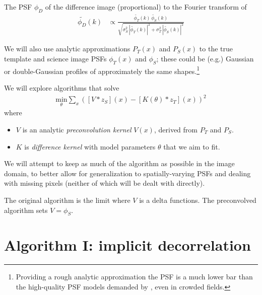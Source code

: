 \documentclass[DM,authoryear,toc]{lsstdoc}
\newcommand{\ZOGY}{\citetalias{2016ApJ...830...27Z}}
\newcommand{\AL}{\citetalias{1998ApJ...503..325A}}
\begin{document}
The PSF $\phi_D$ of the difference image (proportional) to the Fourier transform of
\begin{align}
  \widetilde{\phi_D}(k) &\propto \frac{
      \widetilde{\phi_T}(k) \, \widetilde{\phi_S}(k)
    }{
      \sqrt{
          \sigma_S^2 \, \left|\widetilde{\phi_T}(k)\right|^2
          + \sigma_T^2 \, \left|\widetilde{\phi_S}(k)\right|^2
      }
    }
  \label{eqn:zogy-psf}
\end{align}

We will also use analytic approximations $P_T(x)$ and $P_S(x)$ to the true template and science image PSFs $\phi_T(x)$ and $\phi_S$; these could be (e.g.) Gaussian or double-Gaussian profiles of approximately the same shapes.\footnote{Providing a rough analytic approximation the PSF is a much lower bar than the high-quality PSF models demanded by \ZOGY{}, even in crowded fields.}

We will explore algorithms that solve
\begin{align}
  \underset{\theta}{\text{min}} \sum_x \left(
        \left[V \ast z_S\right]\!(x) - \left[K(\theta) \ast z_T\right]\!(x)
      \right)^2
\end{align}
where
\begin{itemize}
  \item $V$ is an analytic \emph{preconvolution kernel} $V(x)$, derived from $P_T$ and $P_S$.
  \item $K$ is \emph{difference kernel} with model parameters $\theta$ that we aim to fit.
\end{itemize}

We will attempt to keep as much of the algorithm as possible in the image domain, to better allow for generalization to spatially-varying PSFs and dealing with missing pixels (neither of which will be dealt with directly).

The original \AL{} algorithm is the limit where $V$ is a delta functions.
The preconvolved \AL{} algorithm sets $V=\phi_S$.

\section{Algorithm I: implicit decorrelation}
\end{document}
